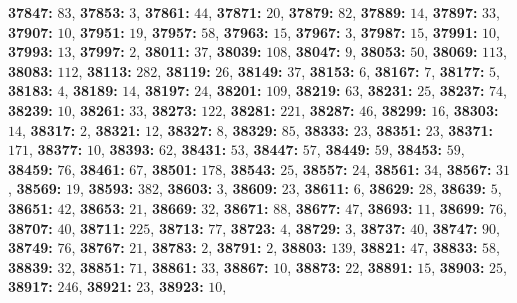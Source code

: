 \textsf{\bfseries 37847:} $83$, \textsf{\bfseries 37853:} $3$, \textsf{\bfseries 37861:} $44$, \textsf{\bfseries 37871:} $20$, \textsf{\bfseries 37879:} $82$, \textsf{\bfseries 37889:} $14$, \textsf{\bfseries 37897:} $33$, \textsf{\bfseries 37907:} $10$, \textsf{\bfseries 37951:} $19$, \textsf{\bfseries 37957:} $58$, \textsf{\bfseries 37963:} $15$, \textsf{\bfseries 37967:} $3$, \textsf{\bfseries 37987:} $15$, \textsf{\bfseries 37991:} $10$, \textsf{\bfseries 37993:} $13$, \textsf{\bfseries 37997:} $2$, \textsf{\bfseries 38011:} $37$, \textsf{\bfseries 38039:} $108$, \textsf{\bfseries 38047:} $9$, \textsf{\bfseries 38053:} $50$, \textsf{\bfseries 38069:} $113$, \textsf{\bfseries 38083:} $112$, \textsf{\bfseries 38113:} $282$, \textsf{\bfseries 38119:} $26$, \textsf{\bfseries 38149:} $37$, \textsf{\bfseries 38153:} $6$, \textsf{\bfseries 38167:} $7$, \textsf{\bfseries 38177:} $5$, \textsf{\bfseries 38183:} $4$, \textsf{\bfseries 38189:} $14$, \textsf{\bfseries 38197:} $24$, \textsf{\bfseries 38201:} $109$, \textsf{\bfseries 38219:} $63$, \textsf{\bfseries 38231:} $25$, \textsf{\bfseries 38237:} $74$, \textsf{\bfseries 38239:} $10$, \textsf{\bfseries 38261:} $33$, \textsf{\bfseries 38273:} $122$, \textsf{\bfseries 38281:} $221$, \textsf{\bfseries 38287:} $46$, \textsf{\bfseries 38299:} $16$, \textsf{\bfseries 38303:} $14$, \textsf{\bfseries 38317:} $2$, \textsf{\bfseries 38321:} $12$, \textsf{\bfseries 38327:} $8$, \textsf{\bfseries 38329:} $85$, \textsf{\bfseries 38333:} $23$, \textsf{\bfseries 38351:} $23$, \textsf{\bfseries 38371:} $171$, \textsf{\bfseries 38377:} $10$, \textsf{\bfseries 38393:} $62$, \textsf{\bfseries 38431:} $53$, \textsf{\bfseries 38447:} $57$, \textsf{\bfseries 38449:} $59$, \textsf{\bfseries 38453:} $59$, \textsf{\bfseries 38459:} $76$, \textsf{\bfseries 38461:} $67$, \textsf{\bfseries 38501:} $178$, \textsf{\bfseries 38543:} $25$, \textsf{\bfseries 38557:} $24$, \textsf{\bfseries 38561:} $34$, \textsf{\bfseries 38567:} $31$, \textsf{\bfseries 38569:} $19$, \textsf{\bfseries 38593:} $382$, \textsf{\bfseries 38603:} $3$, \textsf{\bfseries 38609:} $23$, \textsf{\bfseries 38611:} $6$, \textsf{\bfseries 38629:} $28$, \textsf{\bfseries 38639:} $5$, \textsf{\bfseries 38651:} $42$, \textsf{\bfseries 38653:} $21$, \textsf{\bfseries 38669:} $32$, \textsf{\bfseries 38671:} $88$, \textsf{\bfseries 38677:} $47$, \textsf{\bfseries 38693:} $11$, \textsf{\bfseries 38699:} $76$, \textsf{\bfseries 38707:} $40$, \textsf{\bfseries 38711:} $225$, \textsf{\bfseries 38713:} $77$, \textsf{\bfseries 38723:} $4$, \textsf{\bfseries 38729:} $3$, \textsf{\bfseries 38737:} $40$, \textsf{\bfseries 38747:} $90$, \textsf{\bfseries 38749:} $76$, \textsf{\bfseries 38767:} $21$, \textsf{\bfseries 38783:} $2$, \textsf{\bfseries 38791:} $2$, \textsf{\bfseries 38803:} $139$, \textsf{\bfseries 38821:} $47$, \textsf{\bfseries 38833:} $58$, \textsf{\bfseries 38839:} $32$, \textsf{\bfseries 38851:} $71$, \textsf{\bfseries 38861:} $33$, \textsf{\bfseries 38867:} $10$, \textsf{\bfseries 38873:} $22$, \textsf{\bfseries 38891:} $15$, \textsf{\bfseries 38903:} $25$, \textsf{\bfseries 38917:} $246$, \textsf{\bfseries 38921:} $23$, \textsf{\bfseries 38923:} $10$, 
